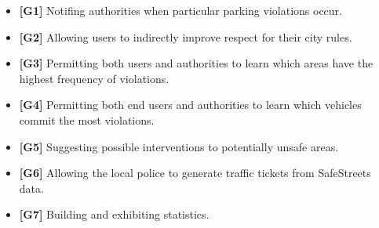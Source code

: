 \begin{itemize}

\item \textbf{[\hypertarget{G1}{G1}]} Notifing authorities when particular parking violations occur.

\item \textbf{[\hypertarget{G2}{G2}]} Allowing users to indirectly improve respect for their city rules.

\item \textbf{[\hypertarget{G3}{G3}]} Permitting both users and authorities to learn which areas have the highest frequency of violations.

\item \textbf{[\hypertarget{G4}{G4}]} Permitting both end users and authorities to learn which vehicles commit the most violations.

\item \textbf{[\hypertarget{G5}{G5}]} Suggesting possible interventions to potentially unsafe areas.

\item \textbf{[\hypertarget{G6}{G6}]} Allowing the local police to generate traffic tickets from SafeStreets data.

\item \textbf{[\hypertarget{G7}{G7}]} Building and exhibiting statistics.

\end{itemize}